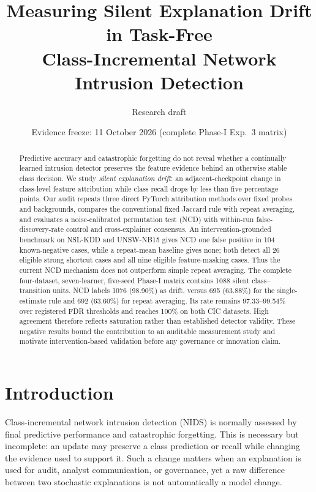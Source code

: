 \documentclass[10pt]{article}
\title{Measuring Silent Explanation Drift in Task-Free\\
Class-Incremental Network Intrusion Detection}
\author{Research draft}
\date{Evidence freeze: 11 October 2026 (complete Phase-I Exp.~3 matrix)}
\newcommand{\ncd}{\textsc{NCD}}
\begin{document}
\maketitle

\begin{abstract}
Predictive accuracy and catastrophic forgetting do not reveal whether a
continually learned intrusion detector preserves the feature evidence behind
an otherwise stable class decision.  We study \emph{silent explanation drift}:
an adjacent-checkpoint change in class-level feature attribution while class
recall drops by less than five percentage points.  Our audit repeats three
direct PyTorch attribution methods over fixed probes and backgrounds, compares
the conventional fixed Jaccard rule with repeat averaging, and evaluates a
noise-calibrated permutation test (\ncd) with within-run false-discovery-rate
control and cross-explainer consensus.  An intervention-grounded benchmark on
NSL-KDD and UNSW-NB15 gives \ncd{} one false positive in 104 known-negative
cases, while a repeat-mean baseline gives none; both detect all 26 eligible
strong shortcut cases and all nine eligible feature-masking cases.  Thus the
current \ncd{} mechanism does not outperform simple repeat averaging.  The
complete four-dataset, seven-learner, five-seed Phase-I matrix contains 1088
silent class--transition units.  \ncd{} labels 1076 (98.90\%) as drift, versus
695 (63.88\%) for the single-estimate rule and 692 (63.60\%) for repeat
averaging.  Its rate remains 97.33--99.54\% over registered FDR thresholds and
reaches 100\% on both CIC datasets.  High agreement therefore reflects
saturation rather than established detector validity.  These negative results
bound the contribution to an auditable measurement study and motivate
intervention-based validation before any governance or innovation claim.
\end{abstract}

\section{Introduction}

Class-incremental network intrusion detection (NIDS) is normally assessed by
final predictive performance and catastrophic forgetting.  This is necessary
but incomplete: an update may preserve a class prediction or recall while
changing the evidence used to support it.  Such a change matters when an
explanation is used for audit, analyst communication, or governance, yet a raw
difference between two stochastic explanations is not automatically a model
change.
\end{document}
